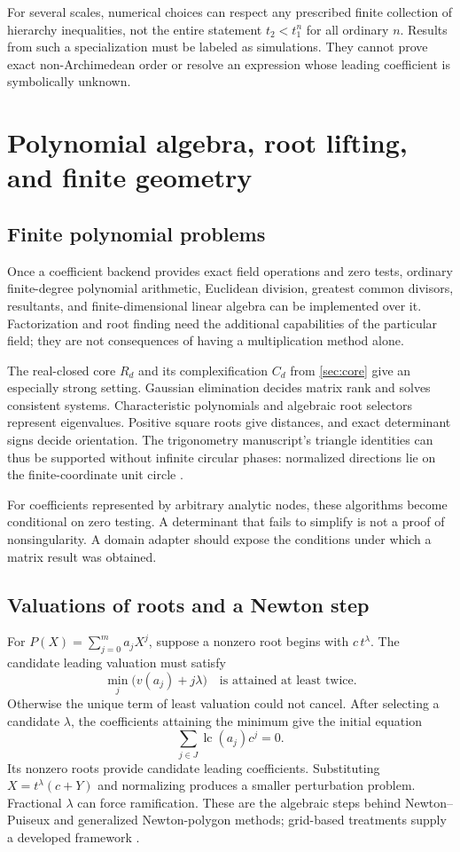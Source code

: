 \documentclass[11pt,letterpaper]{article}
\theoremstyle{definition}
\newcommand{\lc}{\operatorname{lc}}
\numberwithin{equation}{section}
\begin{document}
For several scales, numerical choices can respect any prescribed finite collection of hierarchy inequalities, not the entire statement $t_2<t_1^n$ for all ordinary $n$. Results from such a specialization must be labeled as simulations. They cannot prove exact non-Archimedean order or resolve an expression whose leading coefficient is symbolically unknown.

\section{Polynomial algebra, root lifting, and finite geometry}\label{sec:algebra}
\subsection{Finite polynomial problems}
Once a coefficient backend provides exact field operations and zero tests, ordinary finite-degree polynomial arithmetic, Euclidean division, greatest common divisors, resultants, and finite-dimensional linear algebra can be implemented over it. Factorization and root finding need the additional capabilities of the particular field; they are not consequences of having a multiplication method alone.

The real-closed core $R_d$ and its complexification $C_d$ from \cref{sec:core} give an especially strong setting. Gaussian elimination decides matrix rank and solves consistent systems. Characteristic polynomials and algebraic root selectors represent eigenvalues. Positive square roots give distances, and exact determinant signs decide orientation. The trigonometry manuscript's triangle identities can thus be supported without infinite circular phases: normalized directions lie on the finite-coordinate unit circle \cite{SourceTrig}.

For coefficients represented by arbitrary analytic nodes, these algorithms become conditional on zero testing. A determinant that fails to simplify is not a proof of nonsingularity. A domain adapter should expose the conditions under which a matrix result was obtained.

\subsection{Valuations of roots and a Newton step}
For $P(X)=\sum_{j=0}^m a_jX^j$, suppose a nonzero root begins with $c\,t^\lambda$. The candidate leading valuation must satisfy
\begin{equation}\label{eq:newtonmin}
 \min_j\bigl(v(a_j)+j\lambda\bigr)
 \quad\text{is attained at least twice}.
\end{equation}
Otherwise the unique term of least valuation could not cancel. After selecting a candidate $\lambda$, the coefficients attaining the minimum give the initial equation
\[
 \sum_{j\in J}\lc(a_j)c^j=0.
\]
Its nonzero roots provide candidate leading coefficients. Substituting $X=t^\lambda(c+Y)$ and normalizing produces a smaller perturbation problem. Fractional $\lambda$ can force ramification. These are the algebraic steps behind Newton--Puiseux and generalized Newton-polygon methods; grid-based treatments supply a developed framework \cite{vdH}.
\end{document}
